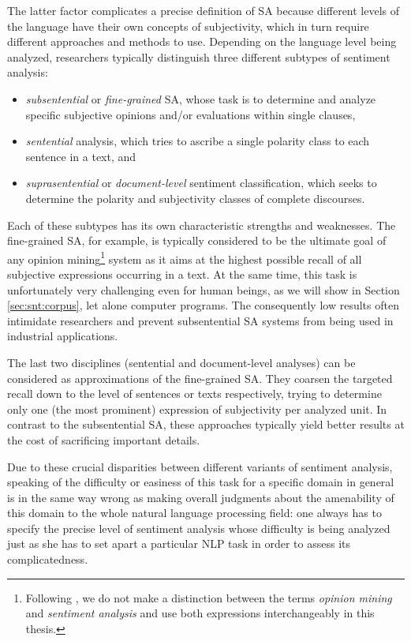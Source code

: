 The latter factor complicates a precise definition of SA because
different levels of the language have their own concepts of
subjectivity, which in turn require different approaches and methods
to use.  Depending on the language level being analyzed, researchers
typically distinguish three different subtypes of sentiment analysis:
\begin{itemize}
  \item\emph{subsentential} or \emph{fine-grained} SA, whose task is
    to determine and analyze specific subjective opinions and/or
    evaluations within single clauses,
  \item\emph{sentential} analysis, which tries to ascribe a single
    polarity class to each sentence in a text, and
  \item\emph{suprasentential} or \emph{document-level} sentiment
    classification, which seeks to determine the polarity and
    subjectivity classes of complete discourses.
\end{itemize}

Each of these subtypes has its own characteristic strengths and
weaknesses.  The fine-grained SA, for example, is typically considered
to be the ultimate goal of any opinion mining\footnote{Following
  \citet{Liu:12}, we do not make a distinction between the terms
  \emph{opinion mining} and \emph{sentiment analysis} and use both
  expressions interchangeably in this thesis.}  system as it aims at
the highest possible recall of all subjective expressions occurring in
a text.  At the same time, this task is unfortunately very challenging
even for human beings, as we will show in Section \ref{sec:snt:corpus},
let alone computer programs.  The consequently low results often
intimidate researchers and prevent subsentential SA systems from being
used in industrial applications.

The last two disciplines (sentential and document-level analyses) can
be considered as approximations of the fine-grained SA.  They coarsen
the targeted recall down to the level of sentences or texts
respectively, trying to determine only one (the most prominent)
expression of subjectivity per analyzed unit.  In contrast to the
subsentential SA, these approaches typically yield better results at
the cost of sacrificing important details.

Due to these crucial disparities between different variants of
sentiment analysis, speaking of the difficulty or easiness of this
task for a specific domain in general is in the same way wrong as
making overall judgments about the amenability of this domain to the
whole natural language processing field: one always has to specify the
precise level of sentiment analysis whose difficulty is being analyzed
just as she has to set apart a particular NLP task in order to assess
its complicatedness.


